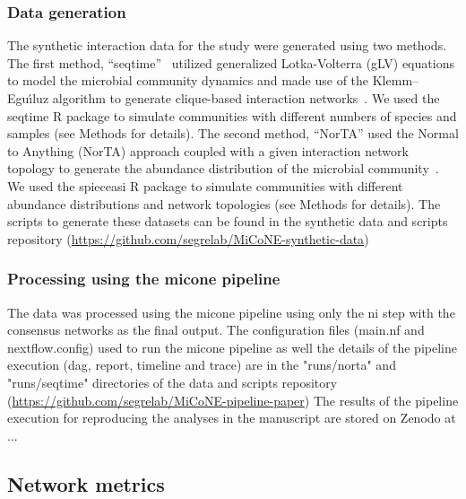     \subsubsection*{Data generation}
    The synthetic interaction data for the study were generated using two methods.
    The first method, ``seqtime''~\cite{faustSignaturesEcologicalProcesses2018} utilized generalized Lotka-Volterra (gLV) equations to model the microbial community dynamics and made use of the Klemm–Eguı́luz algorithm to generate clique-based interaction networks~\cite{Rottjers2018}.
    We used the seqtime R package to simulate communities with different numbers of species and samples (see Methods for details).
    The second method, ``NorTA'' used the Normal to Anything (NorTA) approach coupled with a given interaction network topology to generate the abundance distribution of the microbial community~\cite{Kurtz2015}.
    We used the spieceasi R package to simulate communities with different abundance distributions and network topologies (see Methods for details).
    The scripts to generate these datasets can be found in the synthetic data and scripts repository (\href{https://github.com/segrelab/MiCoNE-synthetic-data}{https://github.com/segrelab/MiCoNE-synthetic-data})

    \subsubsection*{Processing using the \ac{micone} pipeline}
    The data was processed using the \ac{micone} pipeline using only the \ac{ni} step with the consensus networks as the final output.
    The configuration files (main.nf and nextflow.config) used to run the \ac{micone} pipeline as well the details of the pipeline execution (dag, report, timeline and trace) are in the "runs/norta" and "runs/seqtime" directories of the data and scripts repository (\href{https://github.com/segrelab/MiCoNE-pipeline-paper}{https://github.com/segrelab/MiCoNE-pipeline-paper})
    The results of the pipeline execution for reproducing the analyses in the manuscript are stored on Zenodo at ...


  \subsection*{Network metrics}


